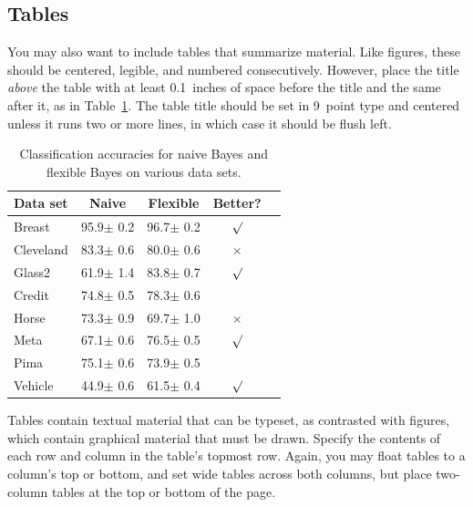 \documentclass{article}
\begin{document}
\subsection{Tables}

You may also want to include tables that summarize material. Like figures, these should be centered, legible, and numbered consecutively. However, place the title {\it above\/} the table with at least 0.1~inches of space before the title and the same after it, as in Table~\ref{sample-table}. The table title should be set in 9~point type and centered unless it runs two or more lines, in which case it should be flush left.


\begin{table}[t]
\caption{Classification accuracies for naive Bayes and flexible
Bayes on various data sets.}
\label{sample-table}
\vskip 0.15in
\begin{center}
\begin{small}
\begin{sc}
\begin{tabular}{lcccr}
\hline
\abovespace\belowspace
Data set & Naive & Flexible & Better? \\
\hline
\abovespace
Breast    & 95.9$\pm$ 0.2& 96.7$\pm$ 0.2& $\surd$ \\
Cleveland & 83.3$\pm$ 0.6& 80.0$\pm$ 0.6& $\times$\\
Glass2    & 61.9$\pm$ 1.4& 83.8$\pm$ 0.7& $\surd$ \\
Credit    & 74.8$\pm$ 0.5& 78.3$\pm$ 0.6&         \\
Horse     & 73.3$\pm$ 0.9& 69.7$\pm$ 1.0& $\times$\\
Meta      & 67.1$\pm$ 0.6& 76.5$\pm$ 0.5& $\surd$ \\
Pima      & 75.1$\pm$ 0.6& 73.9$\pm$ 0.5&         \\
\belowspace
Vehicle   & 44.9$\pm$ 0.6& 61.5$\pm$ 0.4& $\surd$ \\
\hline
\end{tabular}
\end{sc}
\end{small}
\end{center}
\vskip -0.1in
\end{table}

Tables contain textual material that can be typeset, as contrasted with figures, which contain graphical material that must be drawn. Specify the contents of each row and column in the table's topmost row. Again, you may float tables to a column's top or bottom, and set wide tables across both columns, but place two-column tables at the top or bottom of the page.
\end{document}
